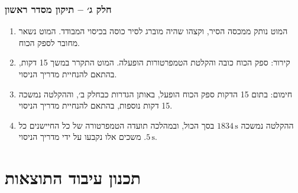\documentclass[10pt,a4paper]{article}
\newcommand{\U}[1]{\,\mathrm{#1}}
\begin{document}
\subsubsection*{חלק ג׳ -- תיקון מסדר ראשון}
\begin{enumerate}
  \item המוט נותק ממכסה הסיר, וקצהו שהיה מוברג לסיר כוסה בכיסוי המבודד. המוט נשאר מחובר לספק הכוח.
  \item קירור: ספק הכוח כובה והקלטת הטמפרטורות הופעלה. המוט התקרר במשך 15 דקות, בהתאם להנחיית מדריך הניסוי.
  \item חימום: בתום 15 הדקות ספק הכוח הופעל, באותן הגדרות כבחלק ב׳, וההקלטה נמשכה 15 דקות נוספות, בהתאם להנחיית מדריך הניסוי.
  \item ההקלטה נמשכה $1834\U{s}$ בסך הכול, ובמהלכה תועדה הטמפרטורה של כל החיישנים כל $5\U{s}$. משכים אלו נקבעו על ידי מדריך הניסוי.
\end{enumerate}

\section*{תכנון עיבוד התוצאות}
\end{document}
